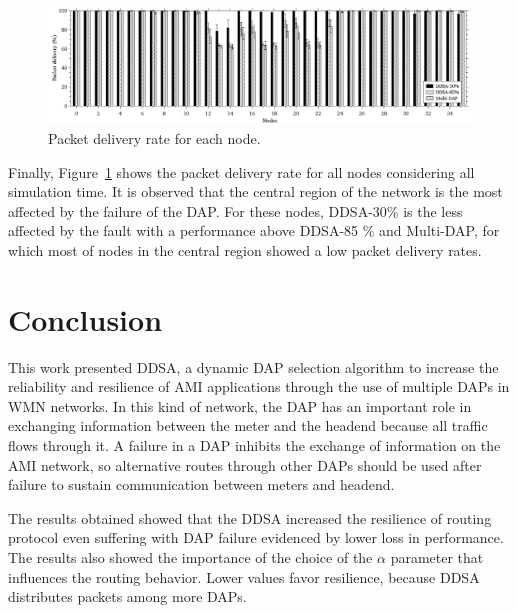 \documentclass[conference]{IEEEtran}
\begin{document}


\begin{figure}[ht]
  \centering
  \mbox{
    {\includegraphics[scale=.155]{IEEE-consolidados/G-no-pdf-app.jpg}}}
  \caption{Packet delivery rate for each node.}
  \label{pdf-node}
\end{figure}


Finally, Figure~\ref{pdf-node} shows the packet delivery rate for all nodes considering all simulation time. It is observed that the central region of the network is the most affected by the failure of the DAP. For these nodes, DDSA-30\% is the less affected by the fault with a performance above DDSA-85 \% and Multi-DAP, for which most of nodes in the central region showed a low packet delivery rates.

\section{Conclusion}

This work presented DDSA, a dynamic DAP selection algorithm to increase the reliability and resilience of AMI applications through the use of multiple DAPs in WMN networks. In this kind of network, the DAP has an important role in exchanging information between the meter and the headend because all traffic flows through it. A failure in a DAP inhibits the exchange of information on the AMI network, so alternative routes through other DAPs should be used after failure to sustain communication between meters and headend.

The results obtained showed that the DDSA increased the resilience of routing protocol even suffering with DAP failure evidenced by lower loss in performance. The results also showed the importance of the choice of the $\alpha$ parameter that influences the routing behavior. Lower values favor resilience, because DDSA distributes packets among more DAPs.
\end{document}
